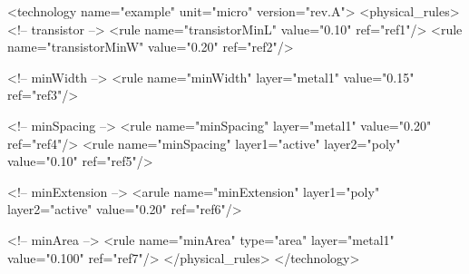 \begin{DoxyCodeInclude}
<technology name=\textcolor{stringliteral}{"example"} unit=\textcolor{stringliteral}{"micro"} version=\textcolor{stringliteral}{"rev.A"}>
   <physical\_rules>
     <!-- transistor -->
     <rule  name=\textcolor{stringliteral}{"transistorMinL"}                                         value=\textcolor{stringliteral}{"0.10"}   ref=\textcolor{stringliteral}{"ref1"}/> 
     <rule  name=\textcolor{stringliteral}{"transistorMinW"}                                         value=\textcolor{stringliteral}{"0.20"}   ref=\textcolor{stringliteral}{"ref2"}/>

     <!-- minWidth -->
     <rule  name=\textcolor{stringliteral}{"minWidth"}           layer=\textcolor{stringliteral}{"metal1"}                      value=\textcolor{stringliteral}{"0.15"}   ref=\textcolor{stringliteral}{"ref3"}/>

     <!-- minSpacing -->
     <rule  name=\textcolor{stringliteral}{"minSpacing"}         layer=\textcolor{stringliteral}{"metal1"}                      value=\textcolor{stringliteral}{"0.20"}   ref=\textcolor{stringliteral}{"ref4"}/>
     <rule  name=\textcolor{stringliteral}{"minSpacing"}         layer1=\textcolor{stringliteral}{"active"}   layer2=\textcolor{stringliteral}{"poly"}     value=\textcolor{stringliteral}{"0.10"}   ref=\textcolor{stringliteral}{"ref5"}/>

     <!-- minExtension -->
     <arule name=\textcolor{stringliteral}{"minExtension"}       layer1=\textcolor{stringliteral}{"poly"}     layer2=\textcolor{stringliteral}{"active"}   value=\textcolor{stringliteral}{"0.20"}   ref=\textcolor{stringliteral}{"ref6"}/>

     <!-- minArea -->
     <rule  name=\textcolor{stringliteral}{"minArea"}            type=\textcolor{stringliteral}{"area"}       layer=\textcolor{stringliteral}{"metal1"}    value=\textcolor{stringliteral}{"0.100"}  ref=\textcolor{stringliteral}{"ref7"}/>
  </physical\_rules>
</technology>

\end{DoxyCodeInclude}


